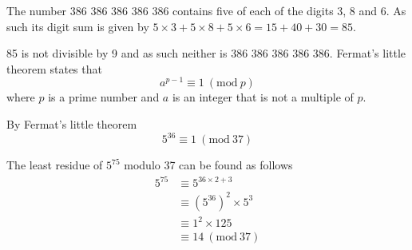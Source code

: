 \documentclass[a4paper,12pt]{article}
\newcommand{\Mod}[1]{\ (\mathrm{mod}\ #1)}
\numberwithin{equation}{section}
\begin{document}
\begin{question}
\qpart
The number 386 386 386 386 386 contains five of each of the digits 3, 8 and 6. As such its digit sum is given by
$5\times3 + 5\times8 + 5\times6 = 15 + 40 + 30 = 85$.

85 is not divisible by 9 and as such neither is 386 386 386 386 386.
\qpart
Fermat's little theorem states that
\[a^{p-1} \equiv 1\Mod{p}\]
where $p$ is a prime number and $a$ is an integer that is not a multiple of $p$.

By Fermat's little theorem 
\[5^{36}\equiv 1 \Mod{37}\]

The least residue of $5^{75}$ modulo 37 can be found as follows
\begin{align*}
5^{75}&\equiv5^{36\times2+3}\\
&\equiv(5^{36})^2\times5^3\\
&\equiv1^2\times125\\
&\equiv14\Mod{37}
\end{align*}
\end{question}
\newpage
\end{document}
